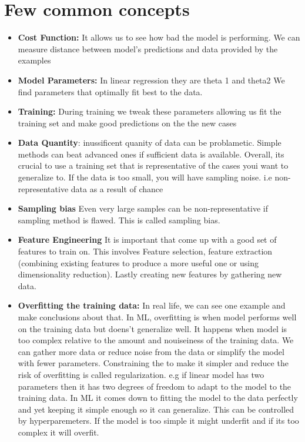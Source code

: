 \documentclass[openany]{book}
\begin{document}
\section{Few common concepts}


\begin{itemize}


    \item \textbf{Cost Function:} It allows us to see how bad the model is performing. We can measure distance between model's predictions and data provided by the examples



    \item \textbf{Model Parameters:} In linear regression they are theta 1 and theta2 We find parameters that optimally fit best to the data. 
    
    \item \textbf{Training: }During training we tweak these parameters allowing us fit the training set and make good predictions on the the new cases 

    \item \textbf{Data Quantity}: inussificent quanity of data can be problametic. Simple methods can beat advanced ones if sufficient data is available. Overall, its crucial to use a training set that is representative of the cases youi want to generalize to. If the data is too small, you will have sampling noise. i.e non-representative data as a result of chance

    \item \textbf{Sampling bias} Even very large samples can be non-representative if sampling method is flawed. This is called sampling bias. 

    \item \textbf{Feature Engineering} It is important that come up with a good set of features to train on. This involves Feature selection, feature extraction (combining existing features to produce a more useful one or using dimensionality reduction). Lastly creating new features by gathering new data. 

    \item \textbf{Overfitting the training data:} In real life, we can see one example and make conclusions about that. In ML, overfitting is when model performs well on the training data but doens't generalize well. It happens when model is too complex relative to the amount and nouiseiness of the training data. We can gather more data or reduce noise from the data or simplify the model with fewer parameters. Constraining the to make it simpler and reduce the risk of overfitting is called regularization. e.g if linear model has two parameters then it has two degrees of freedom to adapt to the model to the training data. In ML it comes down to fitting the model to the data perfectly and yet keeping it simple enough so it can generalize. This can be controlled by hyperparemeters. If the model is too simple it might underfit and if its too complex it will overfit. 


\end{itemize}
\end{document}
